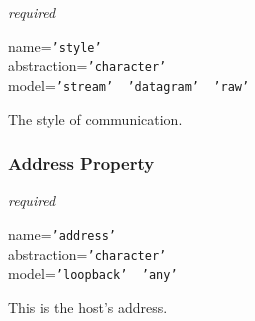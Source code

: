 \emph{required}

name=\texttt{'style'}\\
abstraction=\texttt{'character'}\\
model=\texttt{'stream' \vline\ 'datagram' \vline\ 'raw'}

The style of communication.

\subsubsection{Address Property}

\emph{required}

name=\texttt{'address'}\\
abstraction=\texttt{'character'}\\
model=\texttt{'loopback' \vline\ 'any'}

This is the host's address.
